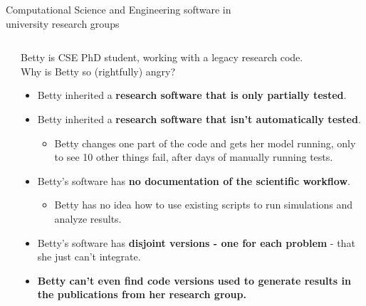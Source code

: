 \begin{frame}{Computational Science and Engineering software in\\university research groups}
\begin{columns}
\begin{column}[c]{0.2\textwidth}
\begin{center}
            \end{center}
        \end{column}
        \begin{column}[c]{0.8\textwidth}
            Betty is CSE PhD student, working with a legacy research code.\\
            Why is Betty so (rightfully) angry? 
            \begin{itemize}
                \item Betty inherited a \textbf{research software that is only partially tested}.
                \item Betty inherited a \textbf{research software that isn't automatically tested}.
                    \begin{itemize}
                        \item Betty changes one part of the code and gets her model running, only to see 10 other things fail, after days of manually running tests. 
                    \end{itemize}
                \item Betty's software has \textbf{no documentation of the scientific workflow}. 
                    \begin{itemize}
                        \item Betty has no idea how to use existing scripts to run simulations and analyze results. 
                    \end{itemize}
                \item Betty's software has \textbf{disjoint versions - one for each problem} - that she just can't integrate. 
                \item \textbf{Betty can't even find code versions used to generate results in the publications from her research group.} 
            \end{itemize}
        \end{column}
    \end{columns}

\end{frame}
